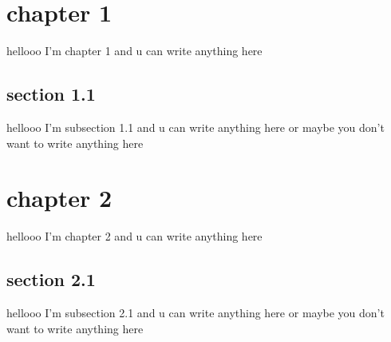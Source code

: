\section{chapter 1}
hellooo I'm chapter 1 and u can write anything here

\subsection{section 1.1}
hellooo I'm subsection 1.1 and u can write anything here or maybe you don't want to write anything here

\section{chapter 2}
hellooo I'm chapter 2 and u can write anything here

\subsection{section 2.1}
hellooo I'm subsection 2.1 and u can write anything here or maybe you don't want to write anything here
